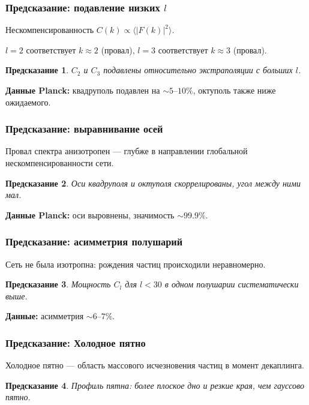 \documentclass[12pt,a4paper]{article}
\newtheorem{prediction}{Предсказание}[section]
\begin{document}
\subsubsection{Предсказание: подавление низких $l$}

Нескомпенсированность $C(k) \propto \langle |F(k)|^2 \rangle$.

$l = 2$ соответствует $k \approx 2$ (провал), $l = 3$ соответствует $k \approx 3$ (провал).

\begin{prediction}
$C_2$ и $C_3$ подавлены относительно экстраполяции с больших $l$.
\end{prediction}

\textbf{Данные Planck:} квадруполь подавлен на $\sim 5$--$10\%$, октуполь также ниже ожидаемого.

\subsubsection{Предсказание: выравнивание осей}

Провал спектра анизотропен --- глубже в направлении глобальной нескомпенсированности сети.

\begin{prediction}
Оси квадруполя и октуполя скоррелированы, угол между ними мал.
\end{prediction}

\textbf{Данные Planck:} оси выровнены, значимость $\sim 99.9\%$.

\subsubsection{Предсказание: асимметрия полушарий}

Сеть не была изотропна: рождения частиц происходили неравномерно.

\begin{prediction}
Мощность $C_l$ для $l < 30$ в одном полушарии систематически выше.
\end{prediction}

\textbf{Данные:} асимметрия $\sim 6$--$7\%$.

\subsubsection{Предсказание: Холодное пятно}

Холодное пятно --- область массового исчезновения частиц в момент декаплинга.

\begin{prediction}
Профиль пятна: более плоское дно и резкие края, чем гауссово пятно.
\end{prediction}
\end{document}
